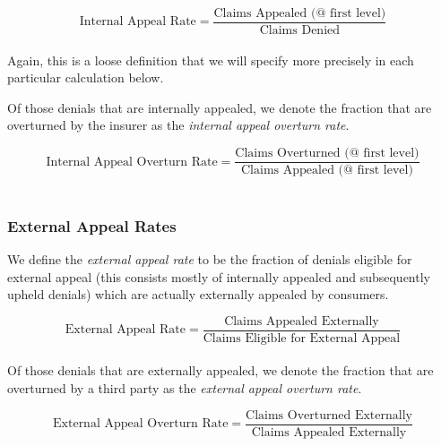\documentclass[12pt, a4paper,twoside,parskip=full]{report}
\theoremstyle{plain} %
\theoremstyle{definition} %
\theoremstyle{remark} %
\numberwithin{equation}{chapter}
\begin{document}
		\begin{equation*}
			\text{Internal Appeal Rate} = \dfrac{\text{Claims Appealed (@ first level)}}{\text{Claims Denied}}
		\end{equation*}
		\hfill\\
		
		Again, this is a loose definition that we will specify more precisely in each particular calculation below.
		
		Of those denials that are internally appealed, we denote the fraction that are overturned by the insurer as the \emph{internal appeal overturn rate}.
		
		\begin{equation*}
			\text{Internal Appeal Overturn Rate} = \dfrac{\text{Claims Overturned (@ first level)}}{\text{Claims Appealed (@ first level)}}
		\end{equation*}
		\hfill\\
		
		
		\subsubsection{External Appeal Rates}
		
		We define the \emph{external appeal rate} to be the fraction of denials eligible for external appeal (this consists mostly of internally appealed and subsequently upheld denials)
		which are actually externally appealed by consumers.
		
		\begin{equation*}
			\text{External Appeal Rate} = \dfrac{\text{Claims Appealed Externally}}{\text{Claims Eligible for External Appeal}}
		\end{equation*}
		\hfill\\
		
		
		Of those denials that are externally appealed, we denote the fraction that are overturned by a third party as the \emph{external appeal overturn rate}.
		
		\begin{equation*}
			\text{External Appeal Overturn Rate} = \dfrac{\text{Claims Overturned Externally}}{\text{Claims Appealed Externally}}
		\end{equation*}
		\hfill\\
		
\end{document}
